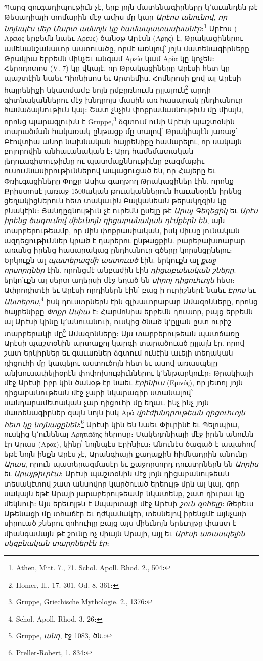 \documentclass{article}
\begin{document}
{Պարզ զուգադիպութիւն չէ, երբ յոյն մատենագիրները կ՚աւանդեն թէ Թեսաղիայի տոմարին մէջ ամիս մը կար \emph{Արէոս անունով, որ նոյնպէս մեր Մարտ ամսոյն կը համապատասխանէր}։\footnote{Athen, Mitt. 7., 71. Schol. Apoll. Rhod. 2., 504։} Արէոս (= Αρειος երբեմն նաեւ Αρευς) ծանօթ Արէսն (Αρης) է, Թրակացիներու ամենանշանաւոր աստուածը, որմէ առնլով՝ յոյն մատենագիրները Թրակիա երբեմն մինչեւ անգամ Αρεία կամ Αρία կը կոչեն։ Հերոդոտոս (V. 7) կը վկայէ, որ Թրակացիները Արէսի հետ կը պաշտէին նաեւ Դիոնիսոս եւ Արտեմիս. Հոմերոսի քով ալ Արէսի հայրենիքի նկատմամբ նոյն ըմբըռնումն ըլլալուն\footnote{Homer, Il., 17. 301, Od. 8. 361։} արդի գիտնականներու մէջ խնդրոյս մասին առ հասարակ ընդհանուր համաձայնութիւն կայ։ Շատ չնչին փոքրամասնութիւն մը միայն, որոնց պարագլուխն է Gruppe,\footnote{Gruppe, Griechische Mythologie. 2., 1376։} ձգտում ունի Արէսի պաշտօնին տարածման հակառակ ընթացք մը տալով՝ Թրակիայէն յառաջ՝ Բէովտիա անոր նախնական հայրենիքը համարելու, որ սակայն բոլորովին անհաւանական է։ Արդ համեմատական լեղուագիտութիւնը ու պատմաքննութիւնը բազմաթիւ ուսումնասիրութիւններով ապացուցած են, որ Հայերը եւ Փռիւգացիները Փոքր Ասիա գաղթող Թրակացիներ էին, որոնք Քրիստոսէ յառաջ 1500ական թուականներուն հաւանօրէն իրենց ցեղակիցներուն հետ տակաւին Բալկանեան թերակղզին կը բնակէին։ Յանդըգնութիւն չէ ուրեմն ըսելը թէ \emph{Արայ Գեղեցիկ} եւ \emph{Արէս իրենց ծագումով միեւնոյն դիցաբանական դէմքերն են}, այն տարբերութեամբ, որ մին փոքրասիական, իսկ միւսը յունական ազդեցութիւններ կրած է դարերու ընթացքին. բարեբախտաբար առանց իրենց հասարակաց ընդհանուր գծերը կորսնցընելու։ Երկուքն ալ \emph{պատերազմի աստուած} էին. երկուքն ալ \emph{քաջ որսորդներ} էին, որոնցմէ անբաժին էին \emph{դիցաբանական շները}. երկո՛ւքն ալ սերտ աղերսի մէջ եղած են \emph{սիրոյ դիցուհւոյն} հետ։ Ափրոդիտէի եւ Արէսի որդիներն էին՝ բաց ի ուրիշներէ նաեւ \emph{Էրոս} եւ \emph{Անտերոս},\footnote{Schol. Apoll. Rhod. 3. 26։} իսկ դուստրներն էին գլխաւորաբար Ամազոնները, որոնց հայրենիքը \emph{Փոքր Ասիա} է։ Հարմոնիա երբեմն դուստր, բայց երբեմն ալ Արէսի կինը կ՚անուանուի, ուսկից ծնած կ՚ըլլան ըստ ուրիշ տարբերակի մը\footnote{Gruppe, \emph{անդ}, էջ 1083, ծն.։} Ամազոնները։ Այս տարբերութեան պատճառը Արէսի պաշտօնին արտաքոյ կարգի տարածուած ըլլալն էր. որով շատ երկիրներ եւ գաւառներ ձգտում ունէին աւելի տեղական դիցուհի մը կապելու աստուծոյն հետ եւ ասով առասպելը անխուսափելիօրէն փոփոխութիւններու կ՚ենթարկուէր։ Թրակիայի մէջ Արէսի իբր կին ծանօթ էր նաեւ \emph{Էրինիւս} (Ερινύς), որ յետոյ յոյն դիցաբանութեան մէջ չարի նկարագիր ստանալով՝ սանդարամետական չար դիցուհի մը եղաւ. ինչ ինչ յոյն մատենագիրներ զայն նոյն իսկ Αρά \emph{վրէժխնդրութեան դիցուհւոյն հետ կը նոյնացընեն}։\footnote{Preller֊Robert, 1. 834։} Արէսի կին են նաեւ Փիւրինէ եւ Պելոպիա, ուսկից կ՚ունենայ Αρητιάδης հերոսը։ Մակեդոնիայի մէջ իրեն անունն էր Արաս (Αρας), կինը՝ նոյնպէս Էրինիւս։ Անունէս ծագած է ապահով՝ եթէ նոյն ինքն Արէս չէ, Արանգիայի քաղաքին հիմնադրին անունը \emph{Արաս}, որուն պատերազմասէր եւ քաջորսորդ դուստրներն են \emph{Աորիս} եւ \emph{Արայթիւրէա}։ Արէսի պաշտօնին մէջ յոյն դիցաբանութեան տեսակէտով շատ անսովոր կարծուած երեույթ մըն ալ կայ, զոր սակայն եթէ Արայի յարաբերութեամբ նկատենք, շատ դիւրաւ կը մեկնուի։ Այս երեւոյթն է Սպարտայի մէջ Արէսի \emph{շուն զոհելը}։ Թերեւս Աթենացի մը տհաճէր եւ դժկամակէր, տեսնելով իրենցմէ այնչափ սիրուած շներու զոհուիլը բայց այս միեւնոյն երեւոյթը փաստ է միանգամայն թէ շունը ոչ միայն Արայի, այլ եւ \emph{Արէսի առասպելին սկզբնական տարրներէն էր}։

}
\end{document}
